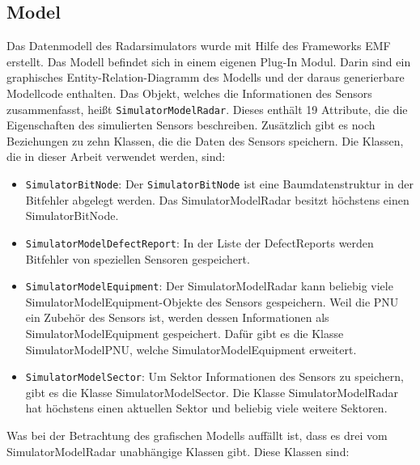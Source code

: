 \subsection{Model}


Das Datenmodell des Radarsimulators wurde mit Hilfe des Frameworks EMF erstellt. Das Modell befindet sich in einem eigenen Plug-In Modul. Darin sind ein graphisches Entity-Relation-Diagramm des Modells und der daraus generierbare Modellcode enthalten. Das Objekt, welches die Informationen des Sensors zusammenfasst, heißt \texttt{SimulatorModelRadar}. Dieses enthält 19 Attribute, die die Eigenschaften des simulierten Sensors beschreiben. Zusätzlich gibt es noch Beziehungen zu zehn Klassen, die die Daten des Sensors speichern. Die Klassen, die in dieser Arbeit verwendet werden, sind:

\begin{itemize}
    \item \texttt{SimulatorBitNode}: Der \texttt{SimulatorBitNode} ist eine Baumdatenstruktur in der Bitfehler abgelegt werden. Das SimulatorModelRadar besitzt höchstens einen SimulatorBitNode.    
    \item \texttt{SimulatorModelDefectReport}: In der Liste der DefectReports werden Bitfehler von speziellen Sensoren gespeichert.
    \item \texttt{SimulatorModelEquipment}: Der SimulatorModelRadar kann beliebig viele SimulatorModelEquipment-Objekte des Sensors gespeichern. Weil die PNU ein Zubehör des Sensors ist, werden dessen Informationen als SimulatorModelEquipment gespeichert. Dafür gibt es die Klasse SimulatorModelPNU, welche SimulatorModelEquipment erweitert. 
    \item \texttt{SimulatorModelSector}: Um Sektor Informationen des Sensors zu speichern, gibt es die Klasse SimulatorModelSector. Die Klasse SimulatorModelRadar hat höchstens einen aktuellen Sektor und beliebig viele weitere Sektoren.    
\end{itemize}

Was bei der Betrachtung des grafischen Modells auffällt ist, dass es drei vom SimulatorModelRadar unabhängige Klassen gibt. Diese Klassen sind:

